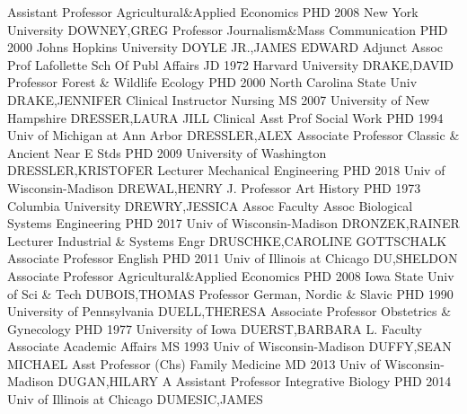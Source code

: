 \documentclass[
]{article}
\begin{document}
\textbar Assistant Professor \textbar{} 
\textbar Agricultural\&Applied Economics \textbar PHD 2008 New York
University \textbar DOWNEY,GREG \textbar Professor \textbar{}
 \textbar Journalism\&Mass Communication \textbar PHD 2000
Johns Hopkins University \textbar DOYLE JR.,JAMES EDWARD
\textbar Adjunct Assoc Prof \textbar{}  \textbar Lafollette
Sch Of Publ Affairs \textbar JD 1972 Harvard University
\textbar DRAKE,DAVID \textbar Professor \textbar{} 
\textbar Forest \& Wildlife Ecology \textbar PHD 2000 North Carolina
State Univ \textbar DRAKE,JENNIFER \textbar Clinical Instructor
\textbar{}  \textbar Nursing \textbar MS 2007 University of
New Hampshire \textbar DRESSER,LAURA JILL \textbar Clinical Asst Prof
\textbar{}  \textbar Social Work \textbar PHD 1994 Univ of
Michigan at Ann Arbor \textbar DRESSLER,ALEX \textbar Associate
Professor \textbar{}  \textbar Classic \& Ancient Near E Stds
\textbar PHD 2009 University of Washington \textbar DRESSLER,KRISTOFER
\textbar Lecturer \textbar{}  \textbar Mechanical Engineering
\textbar PHD 2018 Univ of Wisconsin-Madison \textbar DREWAL,HENRY J.
\textbar Professor \textbar{}  \textbar Art History
\textbar PHD 1973 Columbia University \textbar DREWRY,JESSICA
\textbar Assoc Faculty Assoc \textbar{}  \textbar Biological
Systems Engineering \textbar PHD 2017 Univ of Wisconsin-Madison
\textbar DRONZEK,RAINER \textbar Lecturer \textbar{} 
\textbar Industrial \& Systems Engr \textbar DRUSCHKE,CAROLINE
GOTTSCHALK \textbar Associate Professor \textbar English \textbar{}
 \textbar PHD 2011 Univ of Illinois at Chicago
\textbar DU,SHELDON \textbar Associate Professor
\textbar Agricultural\&Applied Economics \textbar{} 
\textbar PHD 2008 Iowa State Univ of Sci \& Tech \textbar DUBOIS,THOMAS
\textbar Professor \textbar German, Nordic \& Slavic \textbar{}
 \textbar PHD 1990 University of Pennsylvania
\textbar DUELL,THERESA \textbar Associate Professor \textbar Obstetrics
\& Gynecology \textbar{}  \textbar PHD 1977 University of
Iowa \textbar DUERST,BARBARA L. \textbar Faculty Associate
\textbar Academic Affairs \textbar{}  \textbar MS 1993 Univ
of Wisconsin-Madison \textbar DUFFY,SEAN MICHAEL \textbar Asst Professor
(Chs) \textbar Family Medicine \textbar{}  \textbar MD 2013
Univ of Wisconsin-Madison \textbar DUGAN,HILARY A \textbar Assistant
Professor \textbar Integrative Biology \textbar{} 
\textbar PHD 2014 Univ of Illinois at Chicago \textbar DUMESIC,JAMES
\end{document}
